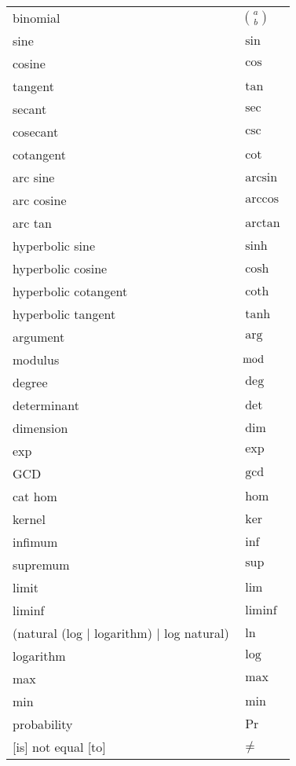 \documentclass[12pt, a4paper]{article}
\begin{document}
\begin{longtable}{ll}
binomial & $\binom{a}{b}$ \\
sine & $\sin$ \\
cosine & $\cos$ \\
tangent & $\tan$ \\
secant & $\sec$ \\
cosecant & $\csc$ \\
cotangent & $\cot$ \\
arc sine & $\arcsin$ \\
arc cosine & $\arccos$ \\
arc tan & $\arctan$ \\
hyperbolic sine & $\sinh$ \\
hyperbolic cosine & $\cosh$ \\
hyperbolic cotangent & $\coth$ \\
hyperbolic tangent & $\tanh$ \\
argument & $\arg$ \\
modulus & $\bmod$ \\
degree & $\deg$ \\
determinant & $\det$ \\
dimension & $\dim$ \\
exp & $\exp$ \\
GCD & $\gcd$ \\
cat hom & $\hom$ \\
kernel & $\ker$ \\
infimum & $\inf$ \\
supremum & $\sup$ \\
limit & $\lim$ \\
liminf & $\liminf$ \\
(natural (log | logarithm) | log natural) & $\ln$ \\
logarithm & $\log$ \\
max & $\max$ \\
min & $\min$ \\
probability & $\Pr$ \\
{[is]} not equal [to] & $\neq$ \\

\end{longtable}
\end{document}
